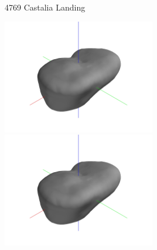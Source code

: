 \begin{frame}{4769 Castalia Landing}

\begin{center}
    \href{https://youtu.be/57sGEJRwfH4}{\includegraphics[trim={20cm 10cm 20cm 10cm},clip,keepaspectratio,width=0.5\textwidth,height=\textheight]{figures/computational_geometry/dynamic_exploration/castalia/partial_14998.jpg}}%
    \href{https://youtu.be/8igpoKcwqXs}{\includegraphics[trim={20cm 10cm 20cm 10cm},clip,keepaspectratio,width=0.5\textwidth,height=\textheight]{figures/computational_geometry/dynamic_exploration/castalia/partial_14998.jpg}}
\end{center}

\end{frame}
